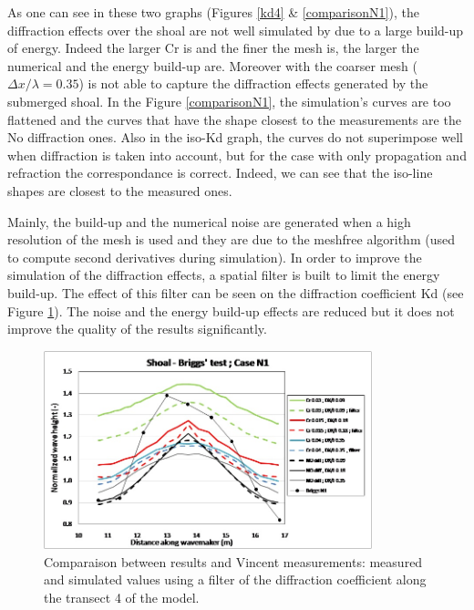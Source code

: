 As one can see in these two graphs (Figures \ref{kd4} \& \ref{comparisonN1}),
the diffraction effects over the shoal are not well simulated by \tomawac due
to a large build-up of energy. Indeed the larger Cr is and the finer the mesh
is, the larger the numerical and the energy build-up are. Moreover with the
coarser mesh ($\Delta x / \lambda = 0.35$) \tomawac is not able to capture the
diffraction effects generated by the submerged shoal. In the Figure
\ref{comparisonN1}, the simulation's curves are too flattened and the curves
that have the shape closest to the measurements are the No diffraction ones.
Also in the iso-Kd graph, the curves do not superimpose well when diffraction
is taken into account, but for the case with only propagation and refraction
the correspondance is correct. Indeed, we can see that the iso-line shapes are
closest to the measured ones.

Mainly, the build-up and the numerical noise are generated when a high
resolution of the mesh is used and they are due to the meshfree algorithm
(used to compute second derivatives during simulation).
In order to improve the simulation of the diffraction effects, a spatial filter
is built to limit the energy build-up. The effect of this filter can be seen on
the diffraction coefficient Kd (see Figure \ref{kdfilter}). The noise and the
energy build-up effects are reduced but it does not improve the quality of the
results significantly.\\

\begin{figure}[H]
  \centering
    \includegraphics[width=0.85\textwidth]{kd_filter.jpg}
    \caption{Comparaison between \tomawac results and Vincent measurements:
      measured and simulated values using a filter of the diffraction
      coefficient along the transect 4 of the model.}
\label{kdfilter}
\end{figure}

